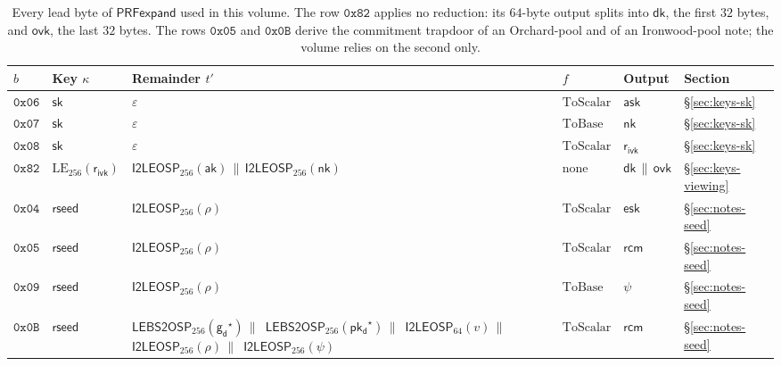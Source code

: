 \documentclass[11pt,a4paper]{article}
\theoremstyle{definition}
\newcommand{\ask}{\ensuremath{\mathsf{ask}}}
\newcommand{\aksym}{\ensuremath{\mathsf{ak}}}
\newcommand{\nksym}{\ensuremath{\mathsf{nk}}}
\newcommand{\ovk}{\ensuremath{\mathsf{ovk}}}
\newcommand{\dk}{\ensuremath{\mathsf{dk}}}
\newcommand{\pkd}{\ensuremath{\mathsf{pk_d}}}
\newcommand{\gd}{\ensuremath{\mathsf{g_d}}}
\newcommand{\rcm}{\ensuremath{\mathsf{rcm}}}
\newcommand{\rivk}{\ensuremath{\mathsf{r_{ivk}}}}
\begin{document}
\begin{table}[ht]
\centering\small
\begin{tabular}{@{}llp{5.6cm}lll@{}}
\toprule
$b$ & Key $\kappa$ & Remainder $t'$ & $f$ & Output & Section \\
\midrule
$\mathtt{0x06}$ & $\mathsf{sk}$ & $\varepsilon$ & $\mathrm{ToScalar}$
  & $\ask$ & \S\ref{sec:keys-sk} \\
$\mathtt{0x07}$ & $\mathsf{sk}$ & $\varepsilon$ & $\mathrm{ToBase}$
  & $\nksym$ & \S\ref{sec:keys-sk} \\
$\mathtt{0x08}$ & $\mathsf{sk}$ & $\varepsilon$ & $\mathrm{ToScalar}$
  & $\rivk$ & \S\ref{sec:keys-sk} \\
$\mathtt{0x82}$ & $\mathrm{LE}_{256}(\rivk)$
  & $\mathsf{I2LEOSP}_{256}(\aksym) \,\|\, \mathsf{I2LEOSP}_{256}(\nksym)$
  & none & $\dk \,\|\, \ovk$ & \S\ref{sec:keys-viewing} \\
$\mathtt{0x04}$ & $\mathsf{rseed}$ & $\mathsf{I2LEOSP}_{256}(\rho)$
  & $\mathrm{ToScalar}$ & $\mathsf{esk}$ & \S\ref{sec:notes-seed} \\
$\mathtt{0x05}$ & $\mathsf{rseed}$ & $\mathsf{I2LEOSP}_{256}(\rho)$
  & $\mathrm{ToScalar}$ & $\rcm$ & \S\ref{sec:notes-seed} \\
$\mathtt{0x09}$ & $\mathsf{rseed}$ & $\mathsf{I2LEOSP}_{256}(\rho)$
  & $\mathrm{ToBase}$ & $\psi$ & \S\ref{sec:notes-seed} \\
$\mathtt{0x0B}$ & $\mathsf{rseed}$
  & $\mathsf{LEBS2OSP}_{256}(\gd^{\star}) \,\|\,$\allowbreak
     $\mathsf{LEBS2OSP}_{256}(\pkd^{\star}) \,\|\,$\allowbreak
     $\mathsf{I2LEOSP}_{64}(v) \,\|\,$\allowbreak
     $\mathsf{I2LEOSP}_{256}(\rho) \,\|\,$\allowbreak
     $\mathsf{I2LEOSP}_{256}(\psi)$
  & $\mathrm{ToScalar}$ & $\rcm$ & \S\ref{sec:notes-seed} \\
\bottomrule
\end{tabular}
\caption{Every lead byte of $\mathsf{PRFexpand}$ used in this volume. The
row $\mathtt{0x82}$ applies no reduction: its $64$-byte output splits into
$\dk$, the first $32$ bytes, and $\ovk$, the last $32$ bytes. The rows
$\mathtt{0x05}$ and $\mathtt{0x0B}$ derive the commitment trapdoor of an
Orchard-pool and of an Ironwood-pool note; the volume relies on the second
only.}
\label{tab:prim-prf}
\end{table}
\end{document}
